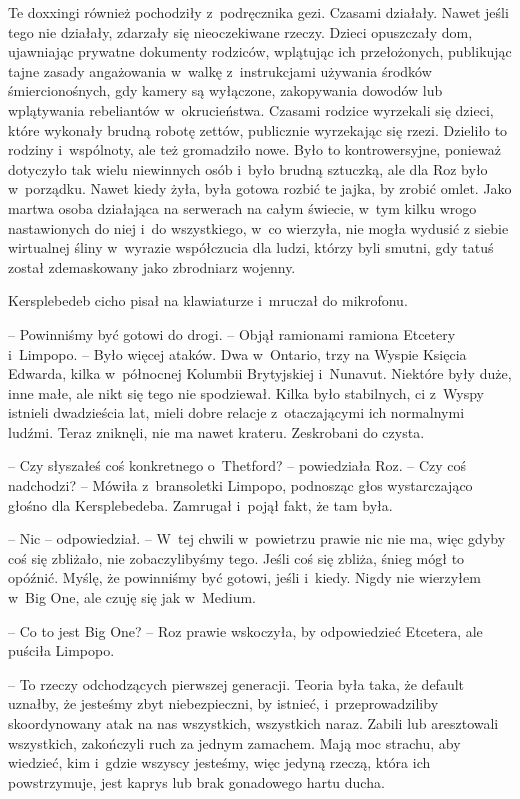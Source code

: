 \documentclass[oneside,polish,11pt,sfheadings]{mwbk}
\begin{document}
Te doxxingi również pochodziły z~podręcznika gezi. Czasami działały.
Nawet jeśli tego nie działały, zdarzały się nieoczekiwane rzeczy. Dzieci
opuszczały dom, ujawniając prywatne dokumenty rodziców, wplątując ich
przełożonych, publikując tajne zasady angażowania w~walkę z~instrukcjami
używania środków śmiercionośnych, gdy kamery są wyłączone, zakopywania
dowodów lub wplątywania rebeliantów w~okrucieństwa. Czasami rodzice
wyrzekali się dzieci, które wykonały brudną robotę zettów, publicznie
wyrzekając się rzezi. Dzieliło to rodziny i~wspólnoty, ale też
gromadziło nowe. Było to kontrowersyjne, ponieważ dotyczyło tak wielu
niewinnych osób i~było brudną sztuczką, ale dla Roz było w~porządku.
Nawet kiedy żyła, była gotowa rozbić te jajka, by zrobić omlet. Jako
martwa osoba działająca na serwerach na całym świecie, w~tym kilku wrogo
nastawionych do niej i~do wszystkiego, w~co wierzyła, nie mogła wydusić
z siebie wirtualnej śliny w~wyrazie współczucia dla ludzi, którzy byli
smutni, gdy tatuś został zdemaskowany jako zbrodniarz wojenny.

Kersplebedeb cicho pisał na klawiaturze i~mruczał do mikrofonu.

-- Powinniśmy być gotowi do drogi. -- Objął ramionami ramiona Etcetery i~Limpopo. -- Było więcej ataków. Dwa w~Ontario, trzy na Wyspie Księcia
Edwarda, kilka w~północnej Kolumbii Brytyjskiej i~Nunavut. Niektóre były
duże, inne małe, ale nikt się tego nie spodziewał. Kilka było
stabilnych, ci z~Wyspy istnieli dwadzieścia lat, mieli dobre relacje z~otaczającymi ich normalnymi ludźmi. Teraz zniknęli, nie ma nawet
krateru. Zeskrobani do czysta.

-- Czy słyszałeś coś konkretnego o~Thetford? -- powiedziała Roz. -- Czy coś
nadchodzi? -- Mówiła z~bransoletki Limpopo, podnosząc głos wystarczająco
głośno dla Kersplebedeba. Zamrugał i~pojął fakt, że tam była.

-- Nic -- odpowiedział. -- W~tej chwili w~powietrzu prawie nic nie ma, więc
gdyby coś się zbliżało, nie zobaczylibyśmy tego. Jeśli coś się zbliża,
śnieg mógł to opóźnić. Myślę, że powinniśmy być gotowi, jeśli i~kiedy.
Nigdy nie wierzyłem w~Big One, ale czuję się jak w~Medium.

-- Co to jest Big One? -- Roz prawie wskoczyła, by odpowiedzieć Etcetera,
ale puściła Limpopo.

-- To rzeczy odchodzących pierwszej generacji. Teoria była taka, że
default uznałby, że jesteśmy zbyt niebezpieczni, by istnieć, i~przeprowadziliby skoordynowany atak na nas wszystkich, wszystkich naraz.
Zabili lub aresztowali wszystkich, zakończyli ruch za jednym zamachem.
Mają moc strachu, aby wiedzieć, kim i~gdzie wszyscy jesteśmy, więc
jedyną rzeczą, która ich powstrzymuje, jest kaprys lub brak gonadowego
hartu ducha.
\end{document}
